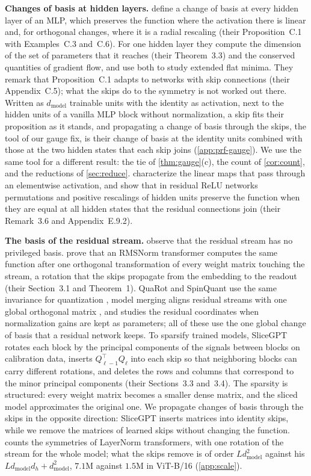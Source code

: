 \documentclass[10pt]{article}
\theoremstyle{definition}
\theoremstyle{remark}
\newcommand{\dm}{d_{\mathrm{model}}}
\newcommand{\para}[1]{\smallskip\noindent\textbf{#1}\hspace{0.5em}}
\begin{document}
\para{Changes of basis at hidden layers.} \citet{zhao2023symmetries} define a change of basis at every hidden layer of an MLP, which preserves the function where the activation there is linear and, for orthogonal changes, where it is a radial rescaling (their Proposition~C.1 with Examples~C.3 and~C.6). For one hidden layer they compute the dimension of the set of parameters that it reaches (their Theorem~3.3) and the conserved quantities of gradient flow, and use both to study extended flat minima. They remark that Proposition~C.1 adapts to networks with skip connections (their Appendix~C.5); what the skips do to the symmetry is not worked out there. Written as $\dm$ trainable units with the identity as activation, next to the hidden units of a vanilla MLP block without normalization, a skip fits their proposition as it stands, and propagating a change of basis through the skips, the tool of our gauge fix, is their change of basis at the identity units combined with those at the two hidden states that each skip joins (\cref{app:prf-gauge}). We use the same tool for a different result: the tie of \cref{thm:gauge}(c), the count of \cref{cor:count}, and the reductions of \cref{sec:reduce}. \citet{godfrey2022symmetries} characterize the linear maps that pass through an elementwise activation, and show that in residual ReLU networks permutations and positive rescalings of hidden units preserve the function when they are equal at all hidden states that the residual connections join (their Remark~3.6 and Appendix~E.9.2).

\para{The basis of the residual stream.} \citet{elhage2021circuits} observe that the residual stream has no privileged basis. \citet{ashkboos2024slicegpt} prove that an RMSNorm transformer computes the same function after one orthogonal transformation of every weight matrix touching the stream, a rotation that the skips propagate from the embedding to the readout (their Section~3.1 and Theorem~1). QuaRot and SpinQuant use the same invariance for quantization \citep{ashkboos2024quarot,liu2024spinquant}, model merging aligns residual streams with one global orthogonal matrix \citep{theus2025glmc}, and \citet{sweeney2026transport} studies the residual coordinates when normalization gains are kept as parameters; all of these use the one global change of basis that a residual network keeps. To sparsify trained models, SliceGPT rotates each block by the principal components of the signals between blocks on calibration data, inserts $Q_{\ell-1}^\top Q_\ell$ into each skip so that neighboring blocks can carry different rotations, and deletes the rows and columns that correspond to the minor principal components (their Sections~3.3 and~3.4). The sparsity is structured: every weight matrix becomes a smaller dense matrix, and the sliced model approximates the original one. We propagate changes of basis through the skips in the opposite direction: SliceGPT inserts matrices into identity skips, while we remove the matrices of learned skips without changing the function. \citet[Sections~4.4 and~4.5]{vannierop2024gauge} counts the symmetries of LayerNorm transformers, with one rotation of the stream for the whole model; what the skips remove is of order $L\dm^2$ against his $L\dm d_h + \dm^2$, $7.1$M against $1.5$M in ViT-B/16 (\cref{app:scale}).
\end{document}
